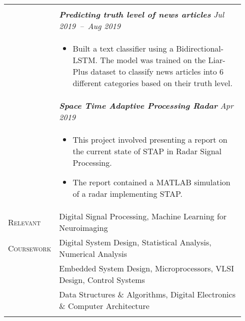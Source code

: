 \documentclass[letterpaper, 10pt, oneside]{article}
\newcommand{\stitle}[1]{\normalsize{\textsc{#1}}}
\newcommand{\bdit}[1]{\textit{\textbf{#1}}}
\begin{document}
\begin{longtable}{@{} p{0.14\linewidth} p{0.8\linewidth}}
{\begin{itemize}[leftmargin=*, itemsep=-0.88ex]
                        \end{itemize}
                    }  
\\
                  & \bdit{Predicting truth level of news articles} \hfill \textit{Jul 2019\ --\ Aug 2019} \\
                  & \parbox{0.8\textwidth}{
                        \begin{itemize}[leftmargin=*, itemsep=-0.88ex]
                            \item Built a text classifier using a Bidirectional-LSTM. 
                                  The model was trained on the Liar-Plus dataset to classify news articles into 
                                  6 different categories based on their truth level.
                        \end{itemize}
                    }  
\\
                  & \bdit{Space Time Adaptive Processing Radar} \hfill \textit{Apr 2019} \\
                  & \parbox{0.8\textwidth}{
                        \begin{itemize}[leftmargin=*, itemsep=-0.88ex]
                            \item This project involved presenting a report on the current state of STAP in Radar Signal Processing.
                            \item The report contained a MATLAB simulation of a radar implementing STAP.
                        \end{itemize}
                    }  
\\


\stitle{Relevant}   & Digital Signal Processing, Machine Learning for Neuroimaging \\
\stitle{Coursework} & Digital System Design, Statistical Analysis, Numerical Analysis \\
                    & Embedded System Design, Microprocessors, VLSI Design, Control Systems \\
                    & Data Structures \& Algorithms, Digital Electronics \& Computer Architecture \\
\\








\end{longtable}
\end{document}
